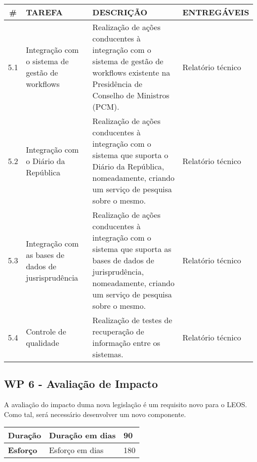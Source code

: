 \vspace{0.5cm}

\begin{longtable}{|c|p{5cm}|p{7cm}|p{3cm}|}
    \hline
    \# & \textbf{TAREFA} & \textbf{DESCRIÇÃO} & \textbf{ENTREGÁVEIS} \\
    \hline
    5.1 & Integração com o sistema de gestão de workflows & Realização de ações conducentes à integração com o 
    sistema de gestão de workflows existente na Presidência de Conselho de Ministros (PCM). & Relatório técnico \\
    \hline
    5.2 & Integração com o Diário da República & Realização de ações conducentes à integração com o sistema que suporta o Diário 
    da República, nomeadamente, criando um serviço de pesquisa sobre o mesmo. & Relatório técnico \\
    \hline
    5.3 & Integração com as bases de dados de jusrisprudência & Realização de ações conducentes à integração com o sistema que 
    suporta as bases de dados de jurisprudência, nomeadamente, criando um serviço de pesquisa sobre o mesmo.
    & Relatório técnico \\
    \hline
    5.4 & Controle de qualidade & Realização de testes de recuperação de informação entre os sistemas.
    & Relatório técnico \\
    \hline
\end{longtable}


\subsection{WP 6 - Avaliação de Impacto}

A avaliação do impacto duma nova legislação é um requisito novo para o LEOS.
Como tal, será necessário desenvolver um novo componente.

\begin{tabular}{|p{3cm}|p{5cm}|l|}
    \hline
    \textbf{Duração} & Duração em dias & 90 \\
    \hline
    \textbf{Esforço} & Esforço em dias & 180\\
    \hline
\end{tabular}

\vspace{0.5cm}

